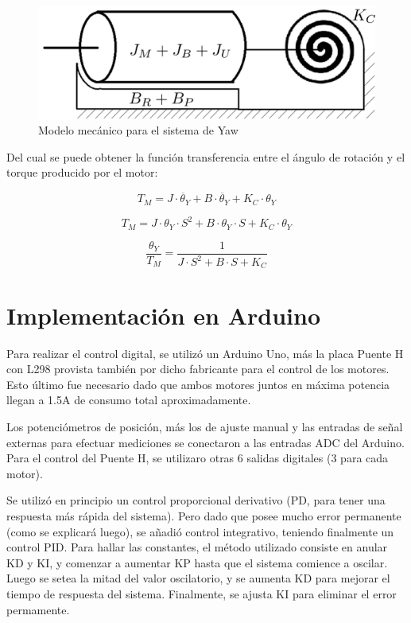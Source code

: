 \documentclass{article}
\begin{document}
\begin{figure}[H]
\centering
\includegraphics[width=0.8\linewidth]{images/modelYaw.png}
\caption{Modelo mecánico para el sistema de Yaw}
\end{figure}

Del cual se puede obtener la función transferencia entre el ángulo de rotación y el torque producido por el motor:

\[
T_M = J \cdot \ddot{\theta_Y} + B \cdot \ddot{\theta_Y} + K_C \cdot \theta_Y
\]

\[
T_M = J \cdot \theta_Y \cdot S^2 + B \cdot \theta_Y \cdot S + K_C \cdot \theta_Y
\]

\[
\frac{\theta_Y}{T_M} = \frac{1}{J \cdot S^2 + B \cdot S + K_C}
\]

\newpage

\section{Implementación en Arduino}

Para realizar el control digital, se utilizó un Arduino Uno, más la placa Puente H con L298 provista también por dicho fabricante para el control de los motores. Esto último fue necesario dado que ambos motores juntos en máxima potencia llegan a 1.5A de consumo total aproximadamente.\par
Los potenciómetros de posición, más los de ajuste manual y las entradas de señal externas para efectuar mediciones se conectaron a las entradas ADC del Arduino. Para el control del Puente H, se utilizaro otras 6 salidas digitales (3 para cada motor).\par
Se utilizó en principio un control proporcional derivativo (PD, para tener una respuesta más rápida del sistema). Pero dado que posee mucho error permanente (como se explicará luego), se añadió control integrativo, teniendo finalmente un control PID. Para hallar las constantes, el método utilizado consiste en anular KD y KI, y comenzar a aumentar KP hasta que el sistema comience a oscilar. Luego se setea la mitad del valor oscilatorio, y se aumenta KD para mejorar el tiempo de respuesta del sistema. Finalmente, se ajusta KI para eliminar el error permamente.\par 
\end{document}
